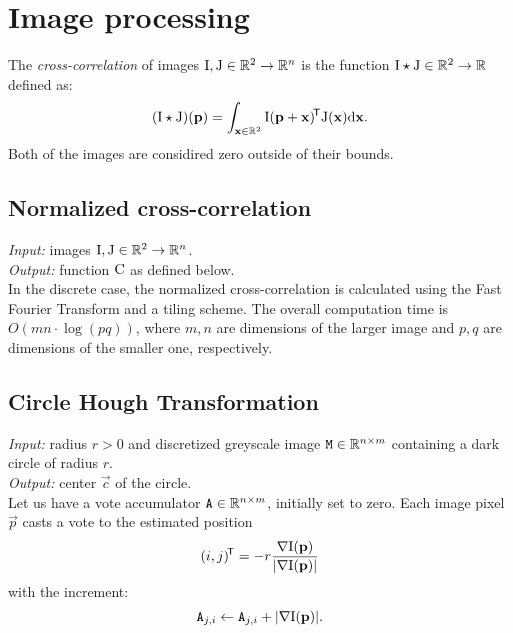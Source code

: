 \section{Image processing}

\begin{definition}
The \textit{cross-correlation} of images $\mathrm{I}, \mathrm{J} \in \mathbb{R}^2 \to \mathbb{R}^n$ is the function $\mathrm{I} \star \mathrm{J} \in \mathbb{R}^2 \to \mathbb{R}$ defined as:
$$
(\mathrm{I} \star \mathrm{J})(\mathbf{p}) = \int_{\mathbf{x} \in \mathbb{R}^2} \mathrm{I}(\mathbf{p} + \mathbf{x})^{\!\mathsf{T}} \mathrm{J}(\mathbf{x}) \mathrm{d} \mathbf{x}.
$$
Both of the images are considired zero outside of their bounds.
\end{definition}

\subsection{Normalized cross-correlation}

\textit{Input:} images $\mathrm{I}, \mathrm{J} \in \mathbb{R}^2 \to \mathbb{R}^n$.\\
\textit{Output:} function $\mathrm{C}$ as defined below.\\


In the discrete case, the normalized cross-correlation is calculated using the Fast Fourier Transform and a tiling scheme.
The overall computation time is $O(mn \cdot \log(pq))$, where $m, n$ are dimensions of the larger image and $p, q$ are dimensions of the smaller one, respectively.

\subsection{Circle Hough Transformation}
\label{s:algo-hough}

\textit{Input:} radius $r > 0$ and discretized greyscale image $\mathtt{M} \in \mathbb{R}^{n \times m}$ containing a dark circle of radius $r$.\\
\textit{Output:} center $\vec c$ of the circle.\\

Let us have a vote accumulator $\mathtt{A} \in \mathbb{R}^{n \times m}$, initially set to zero.
Each image pixel $\vec p$ casts a vote to the estimated position
\begin{equation}
(i, j)^{\!\mathsf{T}} = -r \frac {\nabla \mathrm{I}(\mathbf{p})} {|\nabla \mathrm{I}(\mathbf{p})|}
\end{equation}
with the increment:
\begin{equation}
\mathtt{A}_{j, i} \leftarrow \mathtt{A}_{j, i} + |\nabla \mathrm{I}(\mathbf{p})|.
\end{equation}

